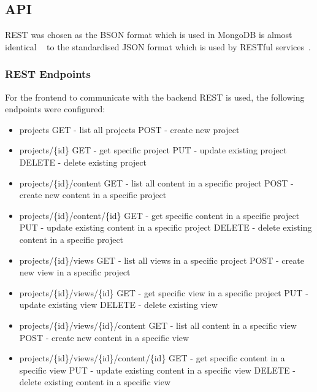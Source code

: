 \documentclass[a4paper,12pt]{article}
\begin{document}
\subsection{API}
REST was chosen as the BSON format which is used in MongoDB is almost identical ~\cite{BSON} to the standardised JSON 
format which is used by RESTful services~\cite{JSON}. 

\subsubsection{REST Endpoints}
For the frontend to communicate with the backend REST is used, the following endpoints were configured:

\begin{itemize}
  \item projects
      \subitem GET - list all projects
      \subitem POST - create new project
  \item projects/\{id\}
      \subitem GET - get specific project
      \subitem PUT - update existing project
      \subitem DELETE - delete existing project
  \item projects/\{id\}/content
      \subitem GET - list all content in a specific project
      \subitem POST - create new content in a specific project 
  \item projects/\{id\}/content/\{id\}
      \subitem GET - get specific content in a specific project
      \subitem PUT - update existing content in a specific project
      \subitem DELETE - delete existing content in a specific project

  \item projects/\{id\}/views
      \subitem GET - list all views in a specific project
      \subitem POST - create new view in a specific project 
  \item projects/\{id\}/views/\{id\}
      \subitem GET - get specific view in a specific project
      \subitem PUT - update existing view
      \subitem DELETE - delete existing view
  \item projects/\{id\}/views/\{id\}/content
      \subitem GET - list all content in a specific view
      \subitem POST - create new content in a specific view 
  \item projects/\{id\}/views/\{id\}/content/\{id\}
      \subitem GET - get specific content in a specific view
      \subitem PUT - update existing content in a specific view
      \subitem DELETE - delete existing content in a specific view


\end{itemize}
\end{document}
